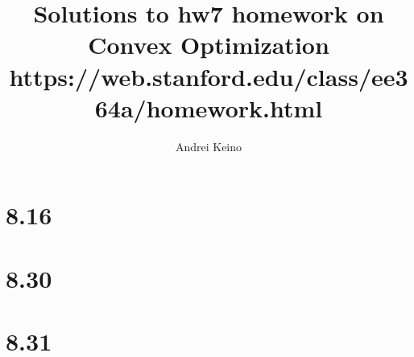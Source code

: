 \documentclass{article}
\begin{document}
\title{Solutions to hw7 homework on Convex Optimization https://web.stanford.edu/class/ee364a/homework.html}
\author{Andrei Keino}
\maketitle



\section*{8.16}

\section*{8.30}

\section*{8.31}
\end{document}
